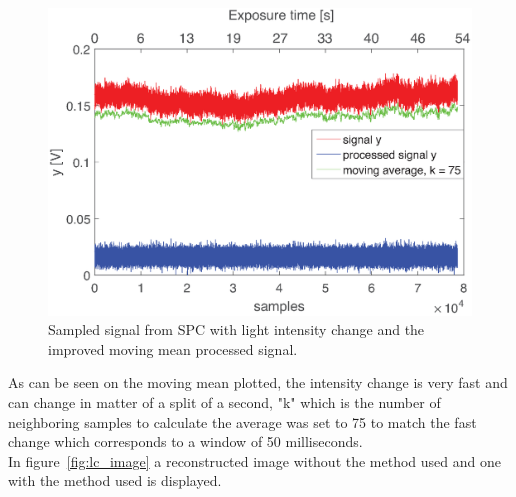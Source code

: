 \begin{figure}[H]
\includegraphics[width = 0.8\linewidth]{result/luminance/li.eps}
	\caption{Sampled signal from SPC with light intensity change and the improved moving mean processed signal.}
	\label{fig:lc_plot}
\end{figure}

As can be seen on the moving mean plotted, the intensity change is very fast and can change in matter of a split of a second, "k" which is the number of neighboring samples to calculate the average  was set to 75 to match the fast change which corresponds to a window of 50 milliseconds.\\[0.1in]

In figure~\ref{fig:lc_image} a reconstructed image without the method used and one with the method used is displayed.

